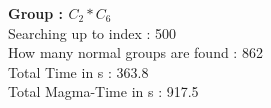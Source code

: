 \textbf{Group : $C_2*C_6$}\\
Searching up to index : 500\\
How many normal groups are found : 862\\
Total Time in s : 363.8\\
Total Magma-Time in s : 917.5\\
